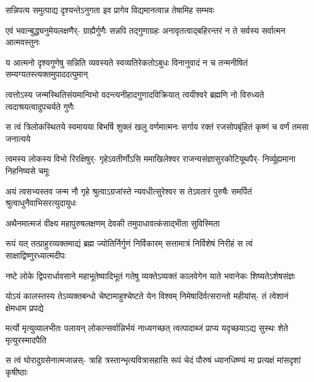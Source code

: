 \twolineshloka
{सन्निपत्य समुत्पाद्य दृश्यन्तेऽनुगता इव}
{प्रागेव विद्यमानत्वान्न तेषामिह सम्भवः} %

\fourlineindentedshloka
{एवं भवान्बुद्ध्यनुमेयलक्षणैर्-}
{ग्राह्यैर्गुणैः सन्नपि तद्गुणाग्रहः}
{अनावृतत्वाद्बहिरन्तरं न ते}
{सर्वस्य सर्वात्मन आत्मवस्तुनः} %

\fourlineindentedshloka
{य आत्मनो दृश्यगुणेषु सन्निति}
{व्यवस्यते स्वव्यतिरेकतोऽबुधः}
{विनानुवादं न च तन्मनीषितं}
{सम्यग्यतस्त्यक्तमुपाददत्पुमान्} %

\fourlineindentedshloka
{त्वत्तोऽस्य जन्मस्थितिसंयमान्विभो}
{वदन्त्यनीहादगुणादविक्रियात्}
{त्वयीश्वरे ब्रह्मणि नो विरुध्यते}
{त्वदाश्रयत्वादुपचर्यते गुणैः} %

\fourlineindentedshloka
{स त्वं त्रिलोकस्थितये स्वमायया}
{बिभर्षि शुक्लं खलु वर्णमात्मनः}
{सर्गाय रक्तं रजसोपबृंहितं}
{कृष्णं च वर्णं तमसा जनात्यये} %

\fourlineindentedshloka
{त्वमस्य लोकस्य विभो रिरक्षिषुर्-}
{गृहेऽवतीर्णोऽसि ममाखिलेश्वर}
{राजन्यसंज्ञासुरकोटियूथपैर्-}
{निर्व्यूह्यमाना निहनिष्यसे चमूः} %

\fourlineindentedshloka
{अयं त्वसभ्यस्तव जन्म नौ गृहे}
{श्रुत्वाऽग्रजांस्ते न्यवधीत्सुरेश्वर}
{स तेऽवतारं पुरुषैः समर्पितं}
{श्रुत्वाधुनैवाभिसरत्युदायुधः} %



\twolineshloka
{अथैनमात्मजं वीक्ष्य महापुरुषलक्षणम्}
{देवकी तमुपाधावत्कंसाद्भीता सुविस्मिता} %



\fourlineindentedshloka
{रूपं यत् तत्प्राहुरव्यक्तमाद्यं}
{ब्रह्म ज्योतिर्निर्गुणं निर्विकारम्}
{सत्तामात्रं निर्विशेषं निरीहं}
{स त्वं साक्षाद्विष्णुरध्यात्मदीपः} %

\fourlineindentedshloka
{नष्टे लोके द्विपरार्धावसाने}
{महाभूतेष्वादिभूतं गतेषु}
{व्यक्तेऽव्यक्तं कालवेगेन याते}
{भवानेकः शिष्यतेऽशेषसंज्ञः} %

\fourlineindentedshloka
{योऽयं कालस्तस्य तेऽव्यक्तबन्धो}
{चेष्टामाहुश्चेष्टते येन विश्वम्}
{निमेषादिर्वत्सरान्तो महीयांस्-}
{तं त्वेशानं क्षेमधाम प्रपद्ये} %

\fourlineindentedshloka
{मर्त्यो मृत्युव्यालभीतः पलायन्}
{लोकान्सर्वान्निर्भयं नाध्यगच्छत्}
{त्वत्पादाब्जं प्राप्य यदृच्छयाऽद्य}
{सुस्थः शेते मृत्युरस्मादपैति} %

\fourlineindentedshloka
{स त्वं घोरादुग्रसेनात्मजान्नस्-}
{त्राहि त्रस्तान्भृत्यवित्रासहासि}
{रूपं चेदं पौरुषं ध्यानधिष्ण्यं}
{मा प्रत्यक्षं मांसदृशां कृषीष्ठाः} %

